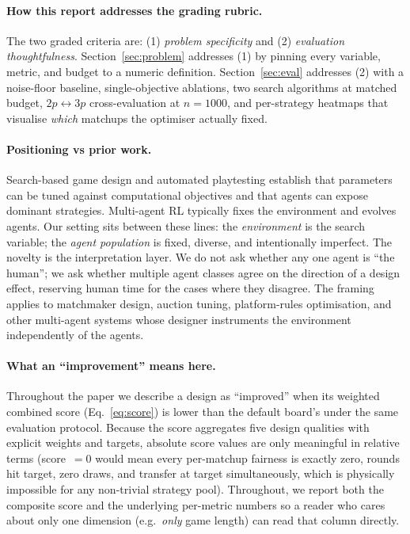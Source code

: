 \documentclass[10pt]{article}
\begin{document}
\paragraph{How this report addresses the grading rubric.}
The two graded criteria are: (1) \emph{problem specificity} and (2)
\emph{evaluation thoughtfulness}. Section~\ref{sec:problem} addresses (1)
by pinning every variable, metric, and budget to a numeric definition.
Section~\ref{sec:eval} addresses (2) with a noise-floor baseline,
single-objective ablations, two search algorithms at matched budget,
$2p\!\leftrightarrow\!3p$ cross-evaluation at $n{=}1000$, and per-strategy
heatmaps that visualise \emph{which} matchups the optimiser actually fixed.

\paragraph{Positioning vs prior work.} Search-based game design and
automated playtesting establish that parameters can be tuned against
computational objectives and that agents can expose dominant
strategies. Multi-agent RL typically fixes the environment and evolves
agents. Our setting sits between these lines: the \emph{environment}
is the search variable; the \emph{agent population} is fixed, diverse,
and intentionally imperfect. The novelty is the interpretation layer.
We do not ask whether any one agent is ``the human''; we ask whether
multiple agent classes agree on the direction of a design effect,
reserving human time for the cases where they disagree. The framing
applies to matchmaker design, auction tuning, platform-rules
optimisation, and other multi-agent systems whose designer instruments
the environment independently of the agents.

\paragraph{What an ``improvement'' means here.} Throughout the paper we
describe a design as ``improved'' when its weighted combined score
(Eq.~\ref{eq:score}) is lower than the default board's under the same
evaluation protocol. Because the score aggregates five design qualities
with explicit weights and targets, absolute score values are only
meaningful in relative terms (score~$=0$ would mean every per-matchup
fairness is exactly zero, rounds hit target, zero draws, and transfer at
target simultaneously, which is physically impossible for any non-trivial
strategy pool). Throughout, we report both the composite score and the
underlying per-metric numbers so a reader who cares about only one
dimension (e.g.\ \emph{only} game length) can read that column directly.
\end{document}
